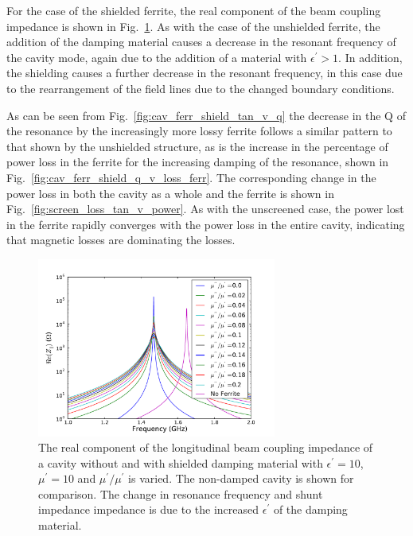 For the case of the shielded ferrite, the real component of the beam coupling impedance is shown in Fig.~\ref{fig:screen_long_imp}. As with the case of the unshielded ferrite, the addition of the damping material causes a decrease in the resonant frequency of the cavity mode, again due to the addition of a material with $\epsilon^{'} > 1$. In addition, the shielding causes a further decrease in the resonant frequency, in this case due to the rearrangement of the field lines due to the changed boundary conditions.

As can be seen from Fig.~\ref{fig:cav_ferr_shield_tan_v_q} the decrease in the Q of the resonance by the increasingly more lossy ferrite follows a similar pattern to that shown by the unshielded structure, as is the increase in the percentage of power loss in the ferrite for the increasing damping of the resonance, shown in Fig.~\ref{fig:cav_ferr_shield_q_v_loss_ferr}. The corresponding change in the power loss in both the cavity as a whole and the ferrite is shown in Fig.~\ref{fig:screen_loss_tan_v_power}. As with the unscreened case, the power lost in the ferrite rapidly converges with the power loss in the entire cavity, indicating that magnetic losses are dominating the losses.	

\begin{figure}
\begin{center}
\includegraphics[width=0.7\textwidth]{Beam_Coupling_Impedance_Reduction_Techniques/figures/screen_long_imp_all.pdf}
\end{center}
\caption{The real component of the longitudinal beam coupling impedance of a cavity without and with shielded damping material with $\epsilon^{'}=10$, $\mu^{'}=10$ and $\mu^{'}/\mu^{'}$ is varied. The non-damped cavity is shown for comparison. The change in resonance frequency and shunt impedance impedance is due to the increased $\epsilon^{'}$ of the damping material.}
\label{fig:screen_long_imp}
\end{figure}


